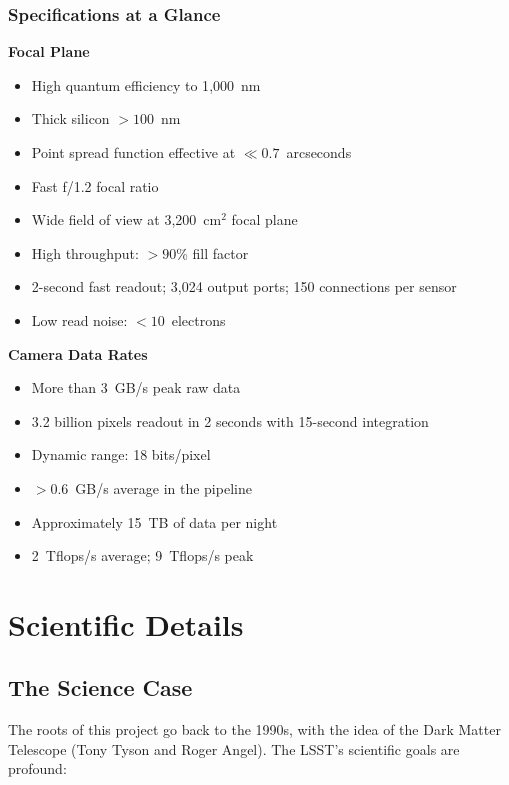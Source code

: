 \documentclass[12pt,a4paper]{article}
\begin{document}
\subsubsection{Specifications at a Glance}

\textbf{Focal Plane}
\begin{itemize}[leftmargin=*]
  \item High quantum efficiency to 1{,}000~nm
  \item Thick silicon $>100$~nm
  \item Point spread function effective at $\ll 0.7$~arcseconds
  \item Fast f/1.2 focal ratio
  \item Wide field of view at 3{,}200~cm$^{2}$ focal plane
  \item High throughput: $>90$\% fill factor
  \item 2-second fast readout; 3{,}024 output ports; 150 connections per sensor
  \item Low read noise: $<10$~electrons
\end{itemize}

\textbf{Camera Data Rates}
\begin{itemize}[leftmargin=*]
  \item More than 3~GB/s peak raw data
  \item 3.2 billion pixels readout in 2 seconds with 15-second integration
  \item Dynamic range: 18 bits/pixel
  \item $>0.6$~GB/s average in the pipeline
  \item Approximately 15~TB of data per night
  \item 2~Tflops/s average; 9~Tflops/s peak
\end{itemize}

\section{Scientific Details}

\subsection{The Science Case}

The roots of this project go back to the 1990s, with the idea of the Dark
Matter Telescope (Tony Tyson and Roger Angel). The LSST's scientific goals are
profound:
\end{document}
